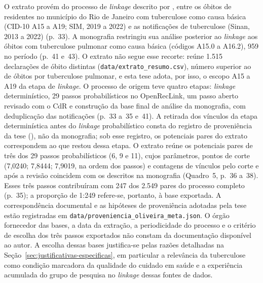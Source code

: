 O extrato provém do processo de \textit{linkage} descrito por , entre os óbitos de residentes no município do Rio de Janeiro com tuberculose como causa básica (CID-10 A15 a A19; SIM, 2019 a 2022) e as notificações de tuberculose (Sinan, 2013 a 2022) (p.~33). A monografia restringiu sua análise posterior ao \textit{linkage} aos óbitos com tuberculose pulmonar como causa básica (códigos A15.0 a A16.2), 959 no período (p.~41 e~43). O extrato não segue esse recorte: reúne 1.515 declarações de óbito distintas (\texttt{data/extrato\_resumo.csv}), número superior ao de óbitos por tuberculose pulmonar, e esta tese adota, por isso, o escopo A15 a A19 da etapa de \textit{linkage}. O processo de origem teve quatro etapas: \textit{linkage} determinístico, 29 passos probabilísticos no OpenRecLink, um passo aberto revisado com o CdR e construção da base final de análise da monografia, com deduplicação das notificações (p.~33 a~35 e~41). A retirada dos vínculos da etapa determinística antes do \textit{linkage} probabilístico consta do registro de proveniência da tese (), não da monografia; sob esse registro, os potenciais pares do extrato correspondem ao que restou dessa etapa. O extrato reúne os potenciais pares de três dos 29 passos probabilísticos (6, 9 e 11), cujos parâmetros, pontos de corte (7,0240; 7,8444; 7,9019, na ordem dos passos) e contagens de vínculos pelo corte e após a revisão coincidem com os descritos na monografia (Quadro~5, p.~36 a~38). Esses três passos contribuíram com 247 dos 2.549 pares do processo completo (p.~35); a proporção de 1:249 refere-se, portanto, à base exportada. A correspondência documental e as hipóteses de proveniência adotadas pela tese estão registradas em \texttt{data/proveniencia\_oliveira\_meta.json}. O órgão fornecedor das bases, a data da extração, a periodicidade do processo e o critério de escolha dos três passos exportados não constam da documentação disponível ao autor. A escolha dessas bases justifica-se pelas razões detalhadas na Seção~\ref{sec:justificativas-especificas}, em particular a relevância da tuberculose como condição marcadora da qualidade do cuidado em saúde e a experiência acumulada do grupo de pesquisa no \textit{linkage} dessas fontes de dados.

